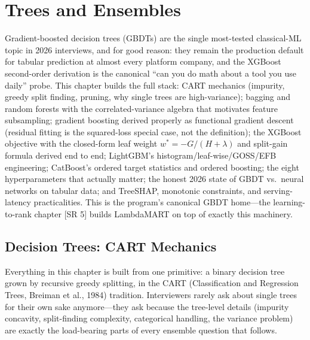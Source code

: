 \chapter{Trees and Ensembles}
\label{cml:chap:trees_ensembles}

\begin{tldr}
Gradient-boosted decision trees (GBDTs) are the single most-tested classical-ML topic in 2026 interviews, and for good reason: they remain the production default for tabular prediction at almost every platform company, and the XGBoost second-order derivation is the canonical ``can you do math about a tool you use daily'' probe. This chapter builds the full stack: CART mechanics (impurity, greedy split finding, pruning, why single trees are high-variance); bagging and random forests with the correlated-variance algebra that motivates feature subsampling; gradient boosting derived properly as functional gradient descent (residual fitting is the squared-loss special case, not the definition); the XGBoost objective with the closed-form leaf weight $w^* = -G/(H+\lambda)$ and split-gain formula derived end to end; LightGBM's histogram/leaf-wise/GOSS/EFB engineering; CatBoost's ordered target statistics and ordered boosting; the eight hyperparameters that actually matter; the honest 2026 state of GBDT vs.\ neural networks on tabular data; and TreeSHAP, monotonic constraints, and serving-latency practicalities. This is the program's canonical GBDT home---the learning-to-rank chapter [SR 5] builds LambdaMART on top of exactly this machinery.
\end{tldr}

\section{Decision Trees: CART Mechanics}
\label{cml:sec:cart}

Everything in this chapter is built from one primitive: a binary decision tree grown by recursive greedy splitting, in the CART (Classification and Regression Trees, Breiman et al., 1984) tradition. Interviewers rarely ask about single trees for their own sake anymore---they ask because the tree-level details (impurity concavity, split-finding complexity, categorical handling, the variance problem) are exactly the load-bearing parts of every ensemble question that follows.

